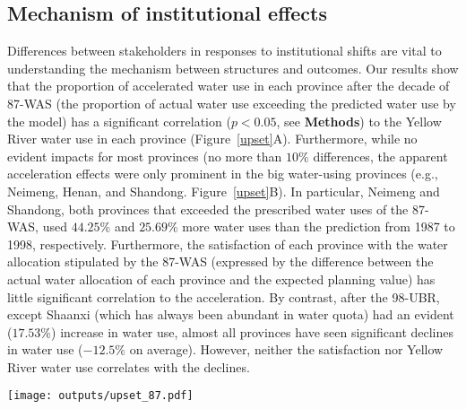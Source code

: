 
\subsection{Mechanism of institutional effects}
\label{result-2}

Differences between stakeholders in responses to institutional shifts are vital to understanding the mechanism between structures and outcomes.
Our results show that the proportion of accelerated water use in each province after the decade of 87-WAS (the proportion of actual water use exceeding the predicted water use by the model) has a significant correlation ($p<0.05$, see \textbf{Methods}) to the Yellow River water use in each province (Figure~\ref{upset}A).
Furthermore, while no evident impacts for most provinces (no more than $10\%$ differences, the apparent acceleration effects were only prominent in the big water-using provinces (e.g., Neimeng, Henan, and Shandong. Figure~\ref{upset}B).
In particular, Neimeng and Shandong, both provinces that exceeded the prescribed water uses of the 87-WAS, used $44.25\%$ and $25.69\%$ more water uses than the prediction from 1987 to 1998, respectively.
Furthermore, the satisfaction of each province with the water allocation stipulated by the 87-WAS (expressed by the difference between the actual water allocation of each province and the expected planning value) has little significant correlation to the acceleration.
By contrast, after the 98-UBR, except Shaanxi (which has always been abundant in water quota) had an evident ($17.53\%$) increase in water use, almost all provinces have seen significant declines in water use ($-12.5\%$ on average).
However, neither the satisfaction nor Yellow River water use correlates with the declines.

\begin{figure*}[!h]
    \centering
    \texttt{[image: outputs/upset\_87.pdf]}
    \caption{
        \textbf{A.} The partial correlation coefficient between wate uses (WU) of Yellow River (YR), unsatisfied ratio (compared with requirements in water plan and supply in the 87-WAS), and the average accelerated ratio.
        \textbf{B.} Average accelerated ratio of water uses for each province in the YRB during the decade after 87-WAS (from 1987 to 1998).
        \textbf{Mian users:} Major water consumption provinces (over the median).
        \textbf{Overused:} violate the 87-WAS in average water uses.
    }
    \label{upset}
\end{figure*}

